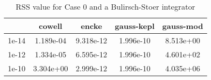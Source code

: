 \begin{table}
\centering
\begin{tabular}{|c|c|c|c|c|}
\hline
 & cowell & encke & gauss-kepl & gauss-mod \\
\hline
1e-14 & 1.189e-04 & 9.318e-12 & 1.996e-10 & 8.513e+00 \\
\hline
1e-12 & 1.334e-05 & 6.595e-12 & 1.996e-10 & 4.601e+02 \\
\hline
1e-10 & 3.304e+00 & 2.999e-12 & 1.996e-10 & 4.035e+06 \\
\hline
\end{tabular}
\caption{RSS value for Case 0 and a Bulirsch-Stoer integrator}
\label{table:tab:keplerapprox_rss_C0_Bulirsch-Stoer}
\end{table}

